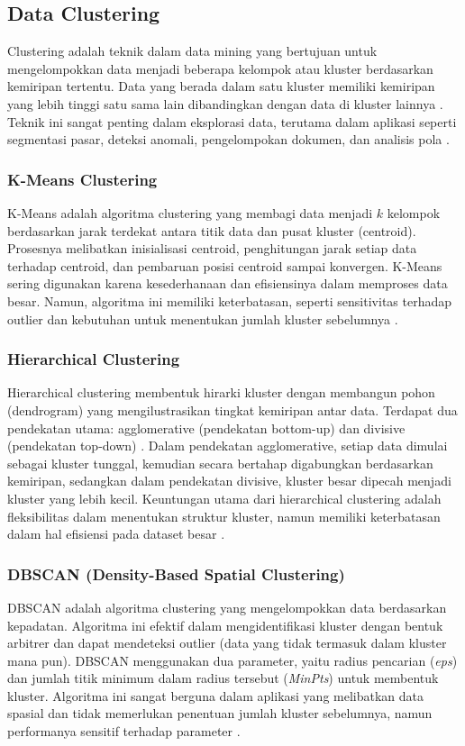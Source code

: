 \subsection{Data Clustering}

Clustering adalah teknik dalam data mining yang bertujuan untuk mengelompokkan data menjadi beberapa kelompok atau kluster berdasarkan kemiripan tertentu. Data yang berada dalam satu kluster memiliki kemiripan yang lebih tinggi satu sama lain dibandingkan dengan data di kluster lainnya \cite{DataClusteringAKJein}. Teknik ini sangat penting dalam eksplorasi data, terutama dalam aplikasi seperti segmentasi pasar, deteksi anomali, pengelompokan dokumen, dan analisis pola \cite{OyewoleClusteringApplication}.

\subsubsection{K-Means Clustering}
K-Means adalah algoritma clustering yang membagi data menjadi $k$ kelompok berdasarkan jarak terdekat antara titik data dan pusat kluster (centroid). Prosesnya melibatkan inisialisasi centroid, penghitungan jarak setiap data terhadap centroid, dan pembaruan posisi centroid sampai konvergen. K-Means sering digunakan karena kesederhanaan dan efisiensinya dalam memproses data besar. Namun, algoritma ini memiliki keterbatasan, seperti sensitivitas terhadap outlier dan kebutuhan untuk menentukan jumlah kluster sebelumnya \cite{ClusteringMethod}.

\subsubsection{Hierarchical Clustering}
Hierarchical clustering membentuk hirarki kluster dengan membangun pohon (dendrogram) yang mengilustrasikan tingkat kemiripan antar data. Terdapat dua pendekatan utama: agglomerative (pendekatan bottom-up) dan divisive (pendekatan top-down) \cite{JohnshonHierarchialCluster}. Dalam pendekatan agglomerative, setiap data dimulai sebagai kluster tunggal, kemudian secara bertahap digabungkan berdasarkan kemiripan, sedangkan dalam pendekatan divisive, kluster besar dipecah menjadi kluster yang lebih kecil. Keuntungan utama dari hierarchical clustering adalah fleksibilitas dalam menentukan struktur kluster, namun memiliki keterbatasan dalam hal efisiensi pada dataset besar \cite{HierarchialClusterSurvey}.

\subsubsection{DBSCAN (Density-Based Spatial Clustering)}
DBSCAN adalah algoritma clustering yang mengelompokkan data berdasarkan kepadatan. Algoritma ini efektif dalam mengidentifikasi kluster dengan bentuk arbitrer dan dapat mendeteksi outlier (data yang tidak termasuk dalam kluster mana pun). DBSCAN menggunakan dua parameter, yaitu radius pencarian (\textit{eps}) dan jumlah titik minimum dalam radius tersebut (\textit{MinPts}) untuk membentuk kluster. Algoritma ini sangat berguna dalam aplikasi yang melibatkan data spasial dan tidak memerlukan penentuan jumlah kluster sebelumnya, namun performanya sensitif terhadap parameter \cite{DbScanClustering}.

